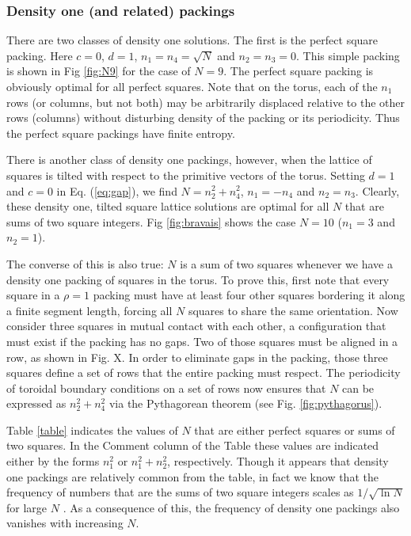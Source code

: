 \subsubsection{Density one (and related) packings}
There are two classes of density one solutions.  The first is the perfect square packing.  Here $c=0$, $d=1$, $n_1=n_4=\sqrt{N}$ and $n_2=n_3=0$.  This simple packing is shown in Fig \ref{fig:N9} for the case of $N=9$.  The perfect square packing is obviously optimal for all perfect squares.  Note that on the torus, each of the $n_1$ rows (or columns, but not both) may be arbitrarily displaced relative to the other rows (columns) without disturbing density of the packing or its periodicity.  Thus the perfect square packings have finite entropy.

There is another class of density one packings, however, when the lattice of squares is tilted with respect to the primitive vectors of the torus. Setting $d=1$ and $c=0$ in Eq. (\ref{eq:gap}), we find $N=n_2^2 + n_4^2$, $n_1=-n_4$ and $n_2 = n_3$.  Clearly, these density one, tilted square lattice solutions are optimal for all $N$ that are sums of two square integers.  Fig \ref{fig:bravais} shows the case $N=10$ ($n_1=3$ and $n_2=1$).

The converse of this is also true: $N$ is a sum of two squares whenever we have a density one packing of squares in the torus.
To prove this, first note that every square in a $\rho=1$ packing must have at least four other squares bordering it along a finite segment length, forcing all $N$ squares to share the same orientation.  Now consider three squares in mutual contact with each other, a configuration that must exist if the packing has no gaps. Two of those squares must be aligned in a row, as shown in Fig. X. In order to eliminate gaps in the packing, those three squares define a set of rows that the entire packing must respect. The periodicity of toroidal boundary conditions on a set of rows now ensures that $N$ can be expressed as $n_2^2 + n_4^2$ via the Pythagorean theorem (see Fig. \ref{fig:pythagorus}).

Table \ref{table} indicates the values of $N$ that are either perfect squares or sums of two squares.  In the Comment column of the Table these values are indicated either by the forms $n_1^2$ or $n_1^2+ n_2^2$, respectively. Though it appears that density one packings are relatively common from the table, in fact we know that the frequency of numbers that are the sums of two square integers scales as $1/\sqrt{\ln N}$ for large $N$ \cite{Berndt1993} \cite{Landau1909}.
 As a consequence of this, the frequency of density one packings also vanishes with increasing $N$.

